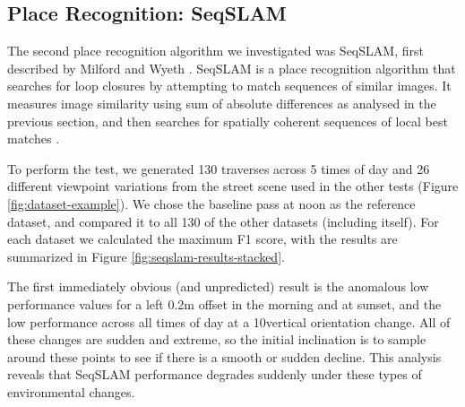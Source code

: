 \documentclass[letterpaper, 10 pt, conference]{ieeeconf}  %
\begin{document}



\subsection{Place Recognition: SeqSLAM}

The second place recognition algorithm we investigated was SeqSLAM, first described by Milford and Wyeth \cite{Milford2012}. SeqSLAM is a place recognition algorithm that searches for loop closures by attempting to match sequences of similar images. It measures image similarity using sum of absolute differences as analysed in the previous section, and then searches for spatially coherent sequences of local best matches \cite{Milford2012}.

To perform the test, we generated 130 traverses across 5 times of day and 26 different viewpoint variations from the street scene used in the other tests (Figure \ref{fig:dataset-example}). We chose the baseline pass at noon as the reference dataset, and compared it to all 130 of the other datasets (including itself). For each dataset we calculated the maximum F1 score, with the results are summarized in Figure \ref{fig:seqslam-results-stacked}.

The first immediately obvious (and unpredicted) result is the anomalous low performance values for a left 0.2m offset in the morning and at sunset, and the low performance across all times of day at a 10\degree vertical orientation change.  All of these changes are sudden and extreme, so the initial inclination is to sample around these points to see if there is a smooth or sudden decline. This analysis reveals that SeqSLAM performance degrades suddenly under these types of environmental changes. 
\end{document}
